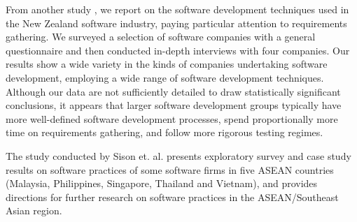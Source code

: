 From another study \cite{Groves2000}, we report on the software development techniques used in the New Zealand software industry, paying particular attention to requirements gathering. We surveyed a selection of software companies with a general questionnaire and then conducted in-depth interviews with four companies. Our results show a wide variety in the kinds of companies undertaking software development, employing a wide range of software development techniques. Although our data are not sufficiently detailed to draw statistically significant conclusions, it appears that larger software development groups typically have more well-defined software development processes, spend proportionally more time on requirements gathering, and follow more rigorous testing regimes.

The study conducted by Sison et. al. \cite{Sison2006} presents exploratory survey and case study results on software practices of some software firms in five ASEAN countries (Malaysia, Philippines, Singapore, Thailand and Vietnam), and provides directions for further research on software practices in the ASEAN/Southeast Asian region.